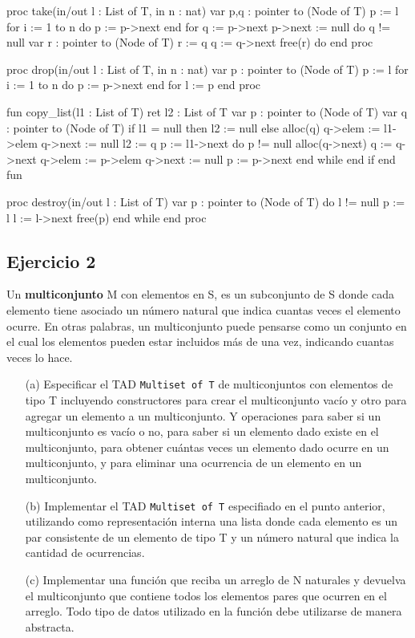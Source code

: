\begin{codebox}
\begin{pascallike}
proc take(in/out l : List of T, in n : nat)
    var p,q : pointer to (Node of T)
    p := l
    for i := 1 to n do
        p := p->next
    end for
    q := p->next
    p->next := null
    do q != null 
        var r : pointer to (Node of T)
        r := q
        q := q->next
        free(r)
    do
end proc

proc drop(in/out l : List of T, in n : nat)
    var p : pointer to (Node of T)
    p := l
    for i := 1 to n do
        p := p->next
    end for
    l := p
end proc

fun copy_list(l1 : List of T) ret l2 : List of T
    var p : pointer to (Node of T)
    var q : pointer to (Node of T)
    if l1 = null then
        l2 := null
    else
        alloc(q)
        q->elem := l1->elem
        q->next := null
        l2 := q
        p := l1->next
        do p != null 
            alloc(q->next)
            q := q->next
            q->elem := p->elem
            q->next := null
            p := p->next
        end while
    end if
end fun

proc destroy(in/out l : List of T)
    var p : pointer to (Node of T)
    do l != null 
        p := l
        l := l->next
        free(p)
    end while
end proc
\end{pascallike}
\end{codebox}

\subsection{Ejercicio 2}
Un \textbf{multiconjunto} M con elementos en S, es un subconjunto de S donde cada elemento tiene asociado un número natural que indica cuantas veces el elemento ocurre. En otras palabras, un multiconjunto puede pensarse como un conjunto en el cual los elementos pueden estar incluidos más de una vez, indicando cuantas veces lo hace.
\begin{itemize}
    \item[(a)] Especificar el TAD \texttt{Multiset of T} de multiconjuntos con elementos de tipo T incluyendo constructores para crear el multiconjunto vacío y otro para agregar un elemento a un multiconjunto. Y operaciones para saber si un multiconjunto es vacío o no, para saber si un elemento dado existe en el multiconjunto, para obtener cuántas veces un elemento dado ocurre en un multiconjunto, y para eliminar una ocurrencia de un elemento en un multiconjunto.
    \item[(b)] Implementar el TAD \texttt{Multiset of T} especifiado en el punto anterior, utilizando como representación interna una lista donde cada elemento es un par consistente de un elemento de tipo T y un número natural que indica la cantidad de ocurrencias.
    \item[(c)] Implementar una función que reciba un arreglo de N naturales y devuelva el multiconjunto que contiene todos los elementos pares que ocurren en el arreglo. Todo tipo de datos utilizado en la función debe utilizarse de manera abstracta. 
\end{itemize}

